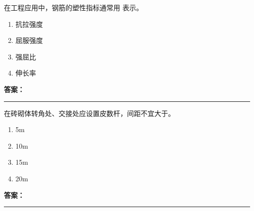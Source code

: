 \documentclass[UTF8,fontset=fandol,11pt]{ctexart}
\newcommand{\answerline}{\textcolor{answerred}{\rule{2.4cm}{0.7pt}}}
\begin{document}
\begin{quizbox}[title={乱序第 46 题｜第四章混凝土结构工程}]

在工程应用中，钢筋的塑性指标通常用 表示。\\

\begin{enumerate}[label=\Alph*.]

\item 抗拉强度

\item 屈服强度

\item 强屈比

\item 伸长率

\end{enumerate}

\textbf{\textcolor{answerred}{答案：}} \answerline

\end{quizbox}

\vspace{0.2em}

\begin{quizbox}[title={乱序第 47 题｜第六章砌筑工程}]

在砖砌体转角处、交接处应设置皮数杆，间距不宜大于。\\

\begin{enumerate}[label=\Alph*.]

\item 5m

\item 10m

\item 15m

\item 20m

\end{enumerate}

\textbf{\textcolor{answerred}{答案：}} \answerline

\end{quizbox}

\vspace{0.2em}
\end{document}

